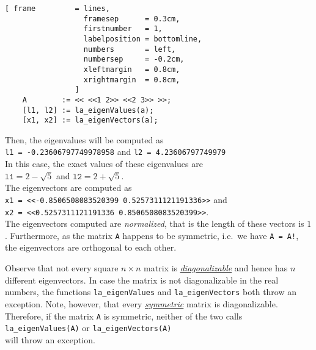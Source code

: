 \begin{Verbatim}[ frame         = lines, 
                  framesep      = 0.3cm, 
                  firstnumber   = 1,
                  labelposition = bottomline,
                  numbers       = left,
                  numbersep     = -0.2cm,
                  xleftmargin   = 0.8cm,
                  xrightmargin  = 0.8cm,
                ]
    A        := << <<1 2>> <<2 3>> >>;
    [l1, l2] := la_eigenValues(a);
    [x1, x2] := la_eigenVectors(a);
\end{Verbatim}

Then, the eigenvalues will be computed as
\\[0.2cm]
\hspace*{1.3cm}
\texttt{l1 = -0.23606797749978958} \quad and \quad \texttt{l2 = 4.23606797749979}
\\[0.2cm]
In this case, the exact values of these eigenvalues are 
\\[0.2cm]
\hspace*{1.3cm}
$\mathtt{l1} = 2 - \sqrt{5}$ \quad and \quad $\mathtt{l2} = 2 + \sqrt{5}$.
\\[0.2cm]
The eigenvectors are computed as 
\\[0.2cm]
\hspace*{1.3cm}
\texttt{x1 = <<-0.8506508083520399 0.5257311121191336>>} \quad and \\
\hspace*{1.3cm}
\texttt{x2 = <<0.5257311121191336 0.8506508083520399>>}.
\\[0.2cm]
The eigenvectors computed are \emph{normalized}, that is the length of these vectors is $1$.
Furthermore, as the matrix \texttt{A} happens to be symmetric, i.e.~we have \texttt{A = A!},
the eigenvectors are orthogonal to each other.

Observe that not every square $n \times n$ matrix is 
\href{http://en.wikipedia.org/wiki/Diagonalizable_matrix}{\emph{diagonalizable}}
and hence has $n$ different eigenvectors.  In case the matrix is not diagonalizable in the real
numbers, the functions \texttt{la\_eigenValues} and \texttt{la\_eigenVectors} both throw an
exception.  Note, however, that every 
\href{http://en.wikipedia.org/wiki/Symmetric_matrix}{\emph{symmetric}} matrix is diagonalizable.
Therefore, if the matrix \texttt{A} is symmetric, neither of the two calls
\\[0.2cm]
\hspace*{1.3cm}
\texttt{la\_eigenValues(A)} \quad or \quad \texttt{la\_eigenVectors(A)}
\\[0.2cm]
will throw an exception.





